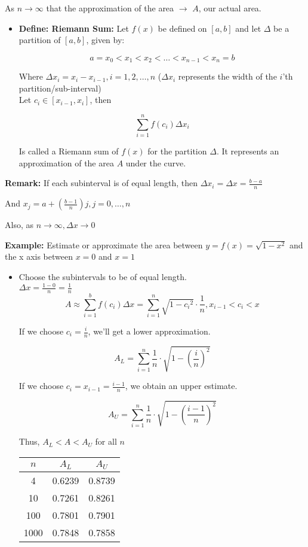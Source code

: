 \documentclass{letter}
\begin{document}
	As $n \rightarrow \infty$ that the approximation of the area $\rightarrow$ $A$, our actual area.
	
	\begin{itemize}
		\item[ ]\textbf{Define: Riemann Sum:} Let $f(x)$ be defined on $[a, b]$ and let $\Delta$ be a partition of $[a, b]$, given by:
		
		\[ a = x_0 < x_1 < x_2 < \dots < x_{n-1} < x_n = b\]
		
		Where $\Delta x_i = x_i - x_{i-1}, i = 1, 2, \dots, n$ ($\Delta x_i$ represents the width of the $i$'th partition/sub-interval)\\
		
		Let $c_i \in [x_{i-1}, x_i]$, then
		
		\[ \sum_{i=1}^n f(c_i) \Delta x_i \]
		
		Is called a Riemann sum of $f(x)$ for the partition $\Delta$. It represents an approximation of the area $A$ under the curve.
	\end{itemize}
	\textbf{Remark: } If each subinterval is of equal length, then $\Delta x_i = \Delta x = \frac{b-a}{n}$
	
	And $x_j = a + (\frac{b-1}{n})j, j = 0,\dots,n$
	
	Also, as $n \rightarrow \infty, \Delta x \rightarrow 0$
	
	\textbf{Example:} Estimate or approximate the area between $y=f(x)=\sqrt{1-x^2}$ and the x axis between $x=0$ and $x=1$
	\begin{itemize}
		\item[ ] Choose the subintervals to be of equal length.\\
		$\Delta x = \frac{1-0}{n}=\frac{1}{n}$\\
		
		\[ A \approx \sum_{i=1}^b f(c_i) \Delta x = \sum_{i=1}^n \sqrt{1-{c_i}^2} \cdot \frac{1}{n}, x_{i-1} < c_i < x \]
		
		If we choose $c_i = \frac{i}{n}$, we'll get a lower approximation.
		
		\[ A_L = \sum_{i=1}^{n} \frac{1}{n} \cdot \sqrt{1 - (\frac{i}{n})^2} \]
		
		If we choose $c_i = x_{i-1} = \frac{i-1}{n}$, we obtain an upper estimate.
		
		\[ A_U = \sum_{i=1}^n \frac{1}{n} \cdot \sqrt{1- (\frac{i-1}{n})^2} \]
		
		Thus, $A_L < A < A_U$ for all $n$\\
		
		\begin{tabular}{c|c|c}
			$n$&$A_L$&$A_U$\\
			\hline
			4&0.6239&0.8739\\
			10&0.7261&0.8261\\
			100&0.7801&0.7901\\
			1000&0.7848&0.7858
		\end{tabular}
	\end{itemize}
\end{document}
